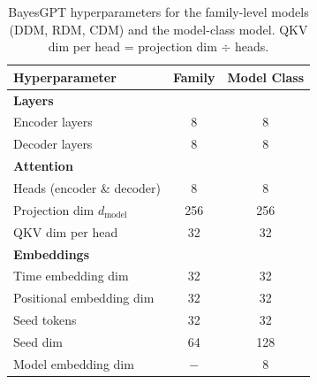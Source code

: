 \begin{table}[ht]
\centering
\small
\caption{BayesGPT hyperparameters for the family-level models (DDM, RDM, CDM) and the model-class model. QKV dim per head = projection dim $\div$ heads.}
\label{tab:hyperparams}
\begin{tabular}{lcc}
\toprule
\textbf{Hyperparameter} & \textbf{Family} & \textbf{Model Class} \\
\midrule
\addlinespace[2pt]
\textbf{Layers} & & \\
\quad Encoder layers & 8 & 8 \\
\quad Decoder layers & 8 & 8 \\
\addlinespace[2pt]
\textbf{Attention} & & \\
\quad Heads (encoder \& decoder) & 8 & 8 \\
\quad Projection dim $d_{\text{model}}$ & 256 & 256 \\
\quad QKV dim per head & 32 & 32 \\
\addlinespace[2pt]
\textbf{Embeddings} & & \\
\quad Time embedding dim & 32 & 32 \\
\quad Positional embedding dim & 32 & 32 \\
\quad Seed tokens & 32 & 32 \\
\quad Seed dim & 64 & 128 \\
\quad Model embedding dim & $-$ & 8 \\
\bottomrule
\end{tabular}
\end{table}